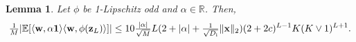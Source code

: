 \documentclass[twoside]{article}
\renewcommand{\ss}[1]{_{\text{#1}}}
\newcommand{\vw}{\mathbf{w}}
\newcommand{\vx}{\mathbf{x}}
\newcommand{\vz}{\mathbf{z}}
\newcommand{\vone}{\mathbf{1}}
\newcommand{\E}{\mathbb{E}}
\renewcommand{\ss}[1]{_{\text{#1}}}        %
\DeclarePairedDelimiter\lra{\langle}{\rangle}    %
\DeclarePairedDelimiter\norm{\|}{\|}             %
\DeclarePairedDelimiter\abs{|}{|}                %
\theoremstyle{theoremstyle}
\newtheorem{lemma}[theorem]{Lemma}
\begin{document}
\begin{lemma}\label{lem:inner_prod}
Let $\phi$ be 1-Lipschitz odd and $\alpha\in \mathbb{R}$. Then,
 \begin{equation}
    \tfrac1{M}\abs{\E[\lra{\vw, \alpha \vone} \lra{\vw, \phi(\vz_L)}]}
    \le 10 \tfrac{\abs{\alpha}}{\sqrt{M}} L(2 + \abs{\alpha} + \tfrac{1}{\sqrt{D\ss{i}}}\norm{\vx}_2)(2 + 2c)^{L - 1}K(K \lor 1)^{L + 1}.
\end{equation}
\end{lemma}
\end{document}
